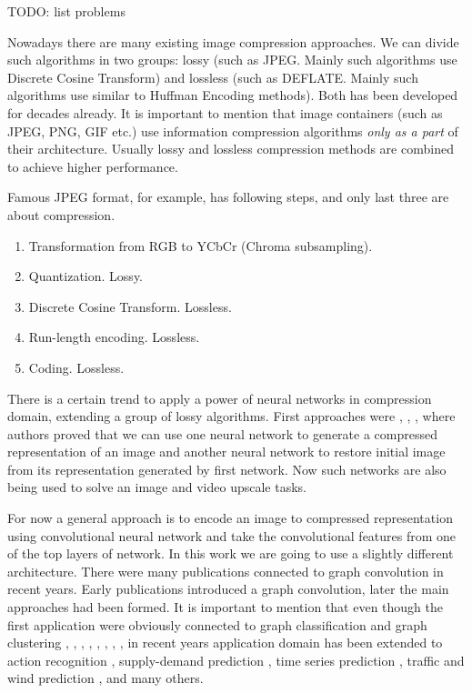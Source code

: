 TODO: list problems

Nowadays there are many existing image compression approaches. We can divide such algorithms in two groups: lossy (such as JPEG. Mainly such algorithms use Discrete Cosine Transform) and lossless (such as DEFLATE. Mainly such algorithms use similar to Huffman Encoding methods). Both has been developed for decades already. It is important to mention that image containers (such as JPEG, PNG, GIF etc.) use information compression algorithms \textit{only as a part} of their architecture. Usually lossy and lossless compression methods are combined to achieve higher performance.

Famous JPEG format, for example, has following steps, and only last three are about compression.

\begin{enumerate}
    \item Transformation from RGB to YCbCr (Chroma subsampling).
    \item Quantization. Lossy.
    \item Discrete Cosine Transform. Lossless.
    \item Run-length encoding. Lossless.
    \item Coding. Lossless.
\end{enumerate}

There is a certain trend to apply a power of neural networks in compression domain, extending a group of lossy algorithms. First approaches were \cite{Balle_Laparra_Simoncelli_2017}, \cite{Theis_Shi_Cunningham_Huszar_2017}, \cite{Toderici_Vincent_Johnston_Hwang_Minnen_Shor_Covell_2017}, where authors proved that we can use one neural network to generate a compressed representation of an image and another neural network to restore initial image from its representation generated by first network. Now such networks are also being used to solve an image and video upscale tasks.

For now a general approach is to encode an image to compressed representation using convolutional neural network and take the convolutional features from one of the top layers of network. In this work we are going to use a slightly different architecture. There were many publications connected to graph convolution in recent years. Early publications introduced a graph convolution, later the main approaches had been formed. It is important to mention that even though the first application were obviously connected to graph classification and graph clustering \cite{Kipf_Welling_2017}, \cite{Defferrard_Bresson_Vandergheynst_2017}, \cite{Fey_Lenssen_Weichert_Muller_2018}, \cite{Hamilton_Ying_Leskovec_2017}, \cite{Hamilton_Ying_Leskovec_2018}, \cite{Monti_Boscaini_Masci_Rodolà_Svoboda_Bronstein_2017}, \cite{Monti_Otness_Bronstein_2018}, \cite{Velicković_Cucurull_Casanova_Romero_Liò_Bengio_2017}, in recent years application domain has been extended to action recognition \cite{Cheng_Zhang_He_Chen_Cheng_Lu_2020}, supply-demand prediction \cite{Jin_Xia_Liu_Murata_Kim_2021}, time series prediction \cite{Cheng_Zhang_He_Chen_Cheng_Lu_2020}, traffic and wind prediction \cite{Cui_Henrickson_Ke_Wang_2020}, \cite{Stańczyk_Mehrkanoon_2021} and many others.

